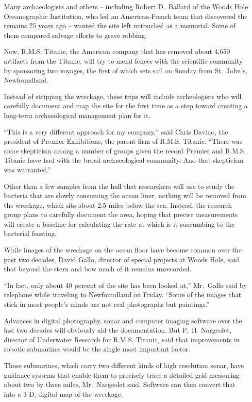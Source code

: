 ﻿\documentclass[12pt]{article}
\begin{document}
Many archaeologists and others -- including Robert D.~Ballard of the Woods Hole Oceanographic
Institution, who led an American-French team that discovered the remains 25 years ago -- wanted the
site left untouched as a memorial. Some of them compared salvage efforts to grave robbing.

Now, R.M.S. Titanic, the American company that has removed about 4,650 artifacts from the Titanic,
will try to mend fences with the scientific community by sponsoring two voyages, the first of which
sets sail on Sunday from St.~John's, Newfoundland.

Instead of stripping the wreckage, these trips will include archeologists who will carefully
document and map the site for the first time as a step toward creating a long-term archaeological
management plan for it.

``This is a very different approach for my company,'' said Chris Davino, the president of Premier
Exhibitions, the parent firm of R.M.S. Titanic. ``There was some skepticism among a number of groups
given the record Premier and R.M.S. Titanic have had with the broad archaeological community. And
that skepticism was warranted.''

Other than a few samples from the hull that researchers will use to study the bacteria that are
slowly consuming the ocean liner, nothing will be removed from the wreckage, which sits about 2.5
miles below the sea. Instead, the research group plans to carefully document the area, hoping that
precise measurements will create a baseline for calculating the rate at which is it succumbing to
the bacterial feasting.

While images of the wreckage on the ocean floor have become common over the past two decades, David
Gallo, director of special projects at Woods Hole, said that beyond the stern and bow much of it
remains unrecorded.

``In fact, only about 40 percent of the site has been looked at,'' Mr.~Gallo said by telephone while
traveling to Newfoundland on Friday. ``Some of the images that stick in most people's minds are not
real photographs but paintings.''

Advances in digital photography, sonar and computer imaging software over the last two decades will
obviously aid the documentation. But P.~H. Nargeolet, director of Underwater Research for R.M.S.
Titanic, said that improvements in robotic submarines would be the single most important factor.

Those submarines, which carry two different kinds of high resolution sonar, have guidance systems
that enable them to precisely trace a detailed grid measuring about two by three miles,
Mr.~Nargeolet said. Software can then convert that into a 3-D, digital map of the wreckage.
\end{document}
